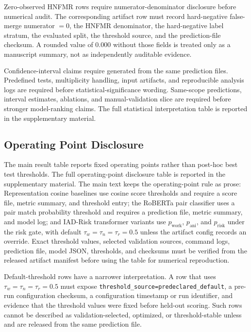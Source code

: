 \documentclass[11pt]{article}
\begin{document}
Zero-observed HNFMR rows require numerator-denominator disclosure before numerical audit. The corresponding artifact row must record hard-negative false-merge numerator $=0$, the HNFMR denominator, the hard-negative label stratum, the evaluated split, the threshold source, and the prediction-file checksum. A rounded value of 0.000 without those fields is treated only as a manuscript summary, not as independently auditable evidence.

Confidence-interval claims require  generated from the same prediction files. Predefined tests, multiplicity handling, input artifacts, and reproducible analysis logs are required before statistical-significance wording. Same-scope predictions, interval estimates, ablations, and manual-validation slice are required before stronger model-ranking claims. The full statistical interpretation table is reported in the supplementary material.

\subsection{Operating Point Disclosure}

The main result table reports fixed operating points rather than post-hoc best test thresholds. The full operating-point disclosure table is reported in the supplementary material. The main text keeps the operating-point rule as prose: Representation cosine baselines use cosine score thresholds and require a score file, metric summary, and threshold entry; the RoBERTa pair classifier uses a pair match probability threshold and requires a prediction file, metric summary, and model log; and IAD-Risk transformer variants use $p_{\mathrm{work}}$, $p_{\mathrm{ani}}$, and $p_{\mathrm{risk}}$ under the risk gate, with default $\tau_w=\tau_n=\tau_r=0.5$ unless the artifact config records an override. Exact threshold values, selected validation sources, command logs, prediction file, model JSON, thresholds, and checksums must be verified from the released artifact manifest before using the table for numerical reproduction.

Default-threshold rows have a narrower interpretation. A row that uses $\tau_w=\tau_n=\tau_r=0.5$ must expose \texttt{threshold\_source=predeclared\_default}, a pre-run configuration checksum, a configuration timestamp or run identifier, and evidence that the threshold values were fixed before held-out scoring. Such rows cannot be described as validation-selected, optimized, or threshold-stable unless  and  are released from the same prediction file.
\end{document}

